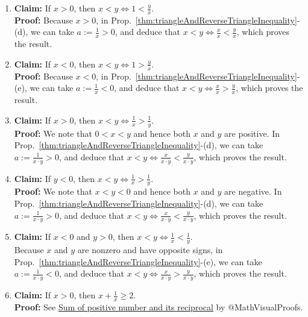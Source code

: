 \begin{enumerate}
\renewcommand{\labelenumi}{(\alph{enumi})}
\setlength{\itemsep}{.2cm}

\item \textbf{Claim:} If $x>0$, then $x < y \iff 1 < \frac{y}{x}.$ \\

\textbf{Proof:} Because $x>0$, in Prop.~\ref{thm:triangleAndReverseTriangleInequality}-(d), we can take $a:=\frac{1}{x} >0$, and deduce that $x < y \iff \frac{x}{x} < \frac{y}{x}$, which proves the result.

\item \textbf{Claim:} If $x<0$, then $x < y \iff 1 > \frac{y}{x}$. \\
   
\textbf{Proof:} Because $x<0$, in Prop.~\ref{thm:triangleAndReverseTriangleInequality}-(e), we can take $a:=\frac{1}{x} <0$, and deduce that $x < y \iff \frac{x}{x}> \frac{y}{x}$, which proves the result.


\item \textbf{Claim:} If $x>0$, then $x < y \iff \frac{1}{x} > \frac{1}{y}$.  \\

\textbf{Proof:} We note that $0 < x < y$ and hence both $x$ and $y$ are positive. In Prop.~\ref{thm:triangleAndReverseTriangleInequality}-(d), we can take $a:=\frac{1}{x\cdot y} >0$, and deduce that $x < y \iff \frac{x}{x \cdot y} < \frac{y}{x \cdot y}$, which proves the result.

\item \textbf{Claim:} If $y<0$, then $x < y \iff \frac{1}{x} > \frac{1}{y}$. \\

\textbf{Proof:} We note that $x < y < 0 $ and hence both $x$ and $y$ are negative. In Prop.~\ref{thm:triangleAndReverseTriangleInequality}-(d), we can take $a:=\frac{1}{x\cdot y} >0$, and deduce that $x < y \iff \frac{x}{x \cdot y} < \frac{y}{x \cdot y}$, which proves the result.\\

\item \textbf{Claim:} If  $x<0$ and $y>0$, then $x < y \iff \frac{1}{x} < \frac{1}{y}$.\\

Because $x$ and $y$ are nonzero and have opposite signs, in Prop.~\ref{thm:triangleAndReverseTriangleInequality}-(e), we can take $a:=\frac{1}{x\cdot y} <0$, and deduce that $x < y \iff \frac{x}{x \cdot y} > \frac{y}{x \cdot y}$, which proves the result.\\

\item \textbf{Claim:} If $x>0$, then $x + \frac{1}{x} \ge 2$.\\

\textbf{Proof:} See \href{https://www.youtube.com/shorts/Il9w86d9mT8}{Sum of positive number and its reciprocal} by @MathVisualProofs.


\end{enumerate} 



